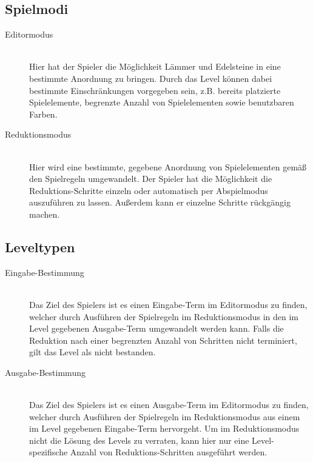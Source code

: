 \subsection{Spielmodi}

\begin{description}
\item[Editormodus] \hfill \\ Hier hat der Spieler die Möglichkeit Lämmer und Edelsteine in eine bestimmte Anordnung zu bringen. Durch das Level können dabei bestimmte Einschränkungen vorgegeben sein, z.B. bereits platzierte Spielelemente, begrenzte Anzahl von Spielelementen sowie benutzbaren Farben.
\item[Reduktionsmodus] \hfill \\ Hier wird eine bestimmte, gegebene Anordnung von Spielelementen gemäß den Spielregeln umgewandelt. Der Spieler hat die Möglichkeit die Reduktions-Schritte einzeln oder automatisch per Abspielmodus auszuführen zu lassen. Außerdem kann er einzelne Schritte rückgängig machen.
\end{description}

\subsection{Leveltypen}

\begin{description}
\item[Eingabe-Bestimmung] \hfill \\ Das Ziel des Spielers ist es einen Eingabe-Term im Editormodus zu finden, welcher durch Ausführen  der Spielregeln im Reduktionsmodus in den im Level gegebenen Ausgabe-Term umgewandelt werden kann. Falls die Reduktion nach einer begrenzten Anzahl von Schritten nicht terminiert, gilt das Level als nicht bestanden.
\item[Ausgabe-Bestimmung] \hfill \\ Das Ziel des Spielers ist es einen Ausgabe-Term im Editormodus zu finden, welcher durch Ausführen  der Spielregeln im Reduktionsmodus aus einem im Level gegebenen Eingabe-Term hervorgeht. Um im Reduktionsmodus nicht die Lösung des Levels zu verraten, kann hier nur eine Level-spezifische Anzahl von Reduktions-Schritten ausgeführt werden.
\end{description}
